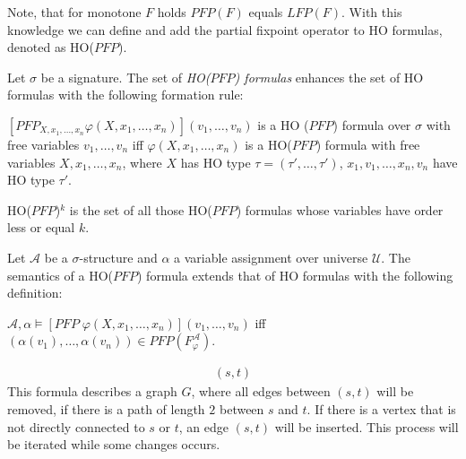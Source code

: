 Note, that for monotone $F$ holds $\mathit{PFP}(F)$ equals $\mathit{LFP}(F)$. With this knowledge we can define and
add the partial fixpoint operator to HO formulas, denoted as HO($\mathit{PFP}$).

\begin{definition}
    Let $\sigma$ be a signature. The set of \emph{HO($\mathit{PFP}$) formulas} enhances the set of HO formulas with the
    following formation rule:
    \begin{compactitem}
        \item $[\mathit{PFP}_{X, x_1, \dots, x_n}\varphi(X, x_1, \dots, x_n)](v_1, \dots, v_n)$ is a HO
        ($\mathit{PFP}$) formula over $\sigma$ with free variables $v_1, \dots, v_n$ iff $\varphi(X, x_1, \dots, x_n)
        $ is a HO($\mathit{PFP}$) formula with free variables $X, x_1, \dots, x_n$, where $X$ has HO type $\tau =
        (\tau', \dots, \tau')$, $x_1, v_1, \dots, x_n, v_n$ have HO type $\tau'$.
    \end{compactitem}
\end{definition}

HO($\mathit{PFP}$)$^k$ is the set of all those HO($\mathit{PFP}$) formulas whose variables have order less or equal $k$.

\begin{definition}
    Let $\mathcal{A}$ be a $\sigma$-structure and $\alpha$ a variable assignment over universe $\mathcal{U}$. The
    semantics of a HO($\mathit{PFP}$) formula extends that of HO formulas with the following definition:
    \begin{compactitem}
        \item $\mathcal{A}, \alpha \models [\mathit{PFP}\;\varphi(X, x_1, \dots, x_n)](v_1, \dots,
        v_n)$ iff $(\alpha(v_1), \dots, \alpha(v_n)) \in \mathit{PFP}(F_\varphi^\mathcal{A})$.
    \end{compactitem}
\end{definition}

\begin{example}{\cite{abiteboul1995computing}}
    \begin{align*}
    [PFP\;(&G(x, y) \wedge \neg \exists z\colon\odot.\,(G(x, z) \wedge G(z, y)) \vee \\
    &\exists z\colon\odot.\,(\neg G(x, z)\wedge\neg G(z, x) \wedge \neg G(y, z) \wedge G(z, y)))](s, t)
    \end{align*}
    This formula describes a graph $G$, where all edges between $(s, t)$ will be removed, if there is a path of
    length $2$ between $s$ and $t$. If there is a vertex that is not directly connected to $s$ or $t$, an edge $(s,
    t)$ will be inserted. This process will be iterated while some changes occurs.
\end{example}